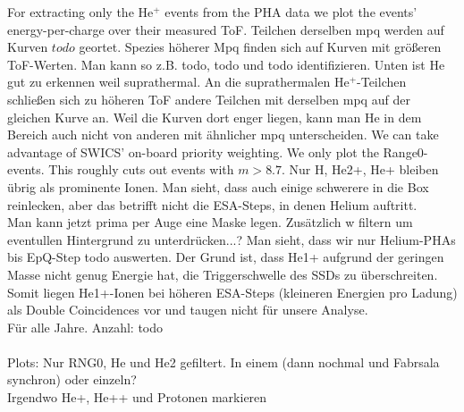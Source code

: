 For extracting only the $\mathrm{He^{+}}$ events from the PHA data we plot the events' energy-per-charge over their measured ToF. 
Teilchen derselben mpq werden auf Kurven $todo$ geortet. Spezies höherer Mpq finden sich auf Kurven mit größeren ToF-Werten. Man kann so z.B. todo, todo und todo identifizieren. Unten ist He gut zu erkennen weil suprathermal. An die suprathermalen $\mathrm{He^{+}}$-Teilchen schließen sich zu höheren ToF andere Teilchen mit derselben mpq auf der gleichen Kurve an. Weil die Kurven dort enger liegen, kann man He in dem Bereich auch nicht von anderen mit ähnlicher mpq unterscheiden.
We can take advantage of SWICS' on-board priority weighting. We only plot the Range0-events. This roughly cuts out events with $m>8.7$. Nur H, He2+, He+ bleiben übrig als prominente Ionen. Man sieht, dass auch einige schwerere in die Box reinlecken, aber das betrifft nicht die ESA-Steps, in denen Helium auftritt.\\
Man kann jetzt prima per Auge eine Maske legen. Zusätzlich w filtern um eventullen Hintergrund zu unterdrücken...?
Man sieht, dass wir nur Helium-PHAs bis EpQ-Step todo auswerten. Der Grund ist, dass He1+ aufgrund der geringen Masse nicht genug Energie hat, die Triggerschwelle des SSDs zu überschreiten. Somit liegen He1+-Ionen bei höheren ESA-Steps (kleineren Energien pro Ladung) als Double Coincidences vor und taugen nicht für unsere Analyse.
\\
Für alle Jahre. Anzahl: todo
\\ \\
Plots: Nur RNG0, He und He2 gefiltert. In einem (dann nochmal und Fabrsala synchron) oder einzeln?
\\
Irgendwo He+, He++ und Protonen markieren


